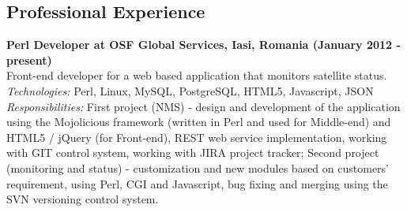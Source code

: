 \documentclass[margin,line,a4paper]{resume}
\begin{document}
\begin{resume}
\section{\mysidestyle Professional Experience}
	\textbf{Perl Developer at OSF Global Services, Iasi, Romania (January 2012 - present)}\\
	Front-end developer for a web based application that monitors satellite status.\\
	\textit{Technologies: }Perl, Linux, MySQL, PostgreSQL, HTML5, Javascript, JSON\\
	\textit{Responsibilities: }First project (NMS) - design and development of the application using the Mojolicious framework (written in Perl and used for Middle-end) and HTML5 / jQuery (for Front-end), REST web service implementation, working with GIT control system, working with JIRA project tracker; Second project (monitoring and status) - customization and new modules based on customers' requirement, using Perl, CGI and Javascript, bug fixing and merging using the SVN versioning control system.


\end{resume}
\end{document}
